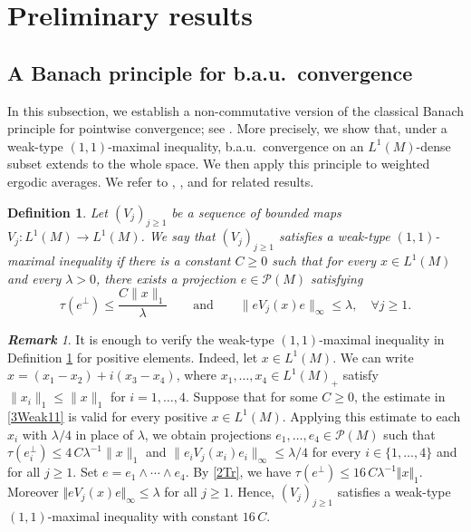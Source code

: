 \documentclass[12pt]{amsart}
\renewcommand{\P}{\mbox{${\mathcal P}$}}
\newcommand{\norm}[1]{\Vert#1\Vert}
\newtheorem{definition}[theorem]{Definition}
\theoremstyle{remark}
\newtheorem{remark}[theorem]{\bf Remark}
\theoremstyle{definition}
\numberwithin{equation}{section}
\begin{document}
\section{Preliminary results}\label{3}

\subsection{A Banach principle for b.a.u.\ convergence}

In this subsection, we establish a non-commutative version of the classical Banach principle for pointwise convergence; see \cite[Chapter 1, Theorem 7.2]{Kren}. More precisely, we show that, under a weak-type $(1,1)$-maximal inequality, b.a.u.\ convergence on an $L^1(M)$-dense subset extends to the whole space. We then apply this principle to weighted ergodic averages. We refer to \cite{Ye}, \cite[Section 6]{JX}, and \cite{CL} for related results. 




\begin{definition}\label{3MI}
Let \((V_j)_{j\ge1}\) be a sequence of bounded 
maps \(V_j : L^1(M) \longrightarrow L^1(M)\).
We say that \((V_j)_{j\ge1}\) satisfies a weak-type
$(1,1)$-maximal inequality if there is a constant \(C\geq 0\) 
such that for every \(x\in L^1(M)\) and every \(\lambda>0\), 
there exists a projection \(e\in \P(M)\) satisfying
\begin{equation}\label{3Weak11}
\tau(e^\perp)\le \frac{C\|x\|_1}{\lambda}
\qquad\text{and}\qquad
\|eV_j(x)e\|_\infty \le \lambda, \quad \forall j\ge1.
\end{equation}
\end{definition}

\begin{remark}\label{3Pos}
It is enough to verify the weak-type $(1,1)$-maximal inequality in Definition \ref{3MI} for positive elements. Indeed, let $x\in L^1(M)$. We can write $x=(x_1-x_2)+i(x_3-x_4)$, where $x_1,\ldots,x_4\in L^1(M)_+$ satisfy $\|x_i\|_1\leq \|x\|_1$ for $i=1,\ldots,4$. Suppose that for some $C\geq0$, the estimate in \eqref{3Weak11} is valid for every positive $x\in L^1(M)$. Applying this estimate to each $x_i$ with $\lambda/4$ in place of $\lambda$, we obtain projections $e_1,\ldots,e_4\in\P(M)$ such that $\tau(e_i^\perp)\leq 4\, C\lambda^{-1}\|x\|_1$ and $\|e_iV_j(x_i)e_i\|_\infty\leq\lambda/4$ for every $i\in\{1,\ldots,4\}$ and for all $j\geq 1$. Set $e=e_1\wedge\cdots\wedge e_4$. By \eqref{2Tr}, we have $\tau(e^\perp)\leq 16\, C\lambda^{-1}\norm{x}_1$. Moreover $\norm{eV_j(x)e}_\infty\leq\lambda$ for
all $j\geq 1$. Hence, $(V_j)_{j\geq1}$ satisfies a weak-type $(1,1)$-maximal inequality with constant $16\, C$.
\end{remark}
\end{document}
